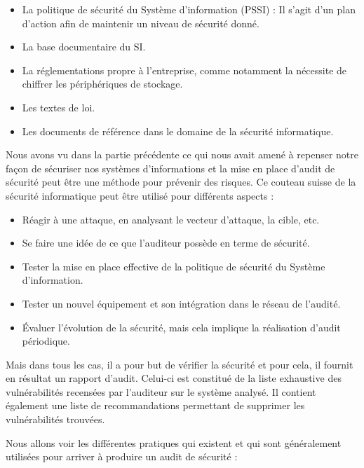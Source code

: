 \documentclass[a4paper]{memoir}
\begin{document}
\begin{itemize}
\item La politique de sécurité du Système d'information (PSSI) : Il s'agit d'un plan d'action afin de maintenir un niveau de sécurité donné.
\item La base documentaire du SI.
\item La réglementations propre à l'entreprise, comme notamment la nécessite de chiffrer les périphériques de stockage.
\item Les textes de loi.
\item Les documents de référence dans le domaine de la sécurité informatique.\\
\end{itemize}

Nous avons vu dans la partie précédente ce qui nous avait amené à repenser notre façon de sécuriser nos systèmes d'informations et la mise en place d'audit de sécurité peut être une méthode pour prévenir des risques. Ce couteau suisse de la sécurité informatique peut être utilisé pour différents aspects :

\begin{itemize}
\item Réagir à une attaque, en analysant le vecteur d'attaque, la cible, etc.
\item Se faire une idée de ce que l'auditeur possède en terme de sécurité.
\item Tester la mise en place effective de la politique de sécurité du Système d'information.
\item Tester un nouvel équipement et son intégration dans le réseau de l'audité.
\item Évaluer l'évolution de la sécurité, mais cela implique la réalisation d'audit périodique.\\
\end{itemize}

Mais dans tous les cas, il a pour but de vérifier la sécurité et pour cela, il fournit en résultat un rapport d'audit. Celui-ci est constitué de la liste exhaustive des vulnérabilités recensées par l'auditeur sur le système analysé. Il contient également une liste de recommandations permettant de supprimer les vulnérabilités trouvées.

Nous allons voir les différentes pratiques qui existent et qui sont généralement utilisées pour arriver à produire un audit de sécurité :\\
\end{document}
